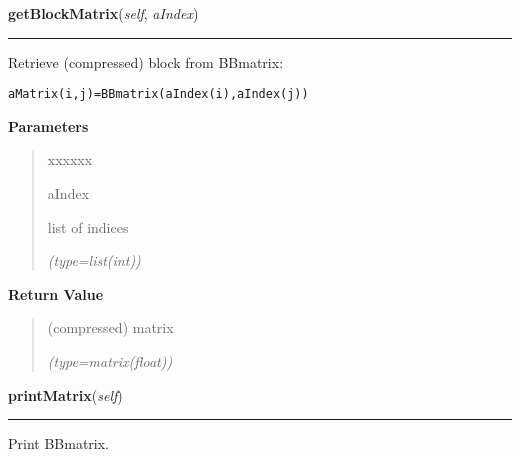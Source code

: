 \hspace{.8\funcindent}\begin{boxedminipage}{\funcwidth}

    \raggedright \textbf{getBlockMatrix}(\textit{self}, \textit{aIndex})

    \vspace{-1.5ex}

    \rule{\textwidth}{0.5\fboxrule}
\setlength{\parskip}{2ex}
    Retrieve (compressed) block from BBmatrix:

\begin{alltt}
 aMatrix(i,j) = BBmatrix(aIndex(i),aIndex(j))\end{alltt}

\setlength{\parskip}{1ex}
      \textbf{Parameters}
      \vspace{-1ex}

      \begin{quote}
        \begin{Ventry}{xxxxxx}

          \item[aIndex]

          list of indices

            {\it (type=list(int))}

        \end{Ventry}

      \end{quote}

      \textbf{Return Value}
    \vspace{-1ex}

      \begin{quote}
      (compressed) matrix

      {\it (type=matrix(float))}

      \end{quote}

    \end{boxedminipage}

    \label{gblnum:BorderedBandMatrix:printMatrix}

    \vspace{0.5ex}

\hspace{.8\funcindent}\begin{boxedminipage}{\funcwidth}

    \raggedright \textbf{printMatrix}(\textit{self})

    \vspace{-1.5ex}

    \rule{\textwidth}{0.5\fboxrule}
\setlength{\parskip}{2ex}
    Print BBmatrix.

\setlength{\parskip}{1ex}
    \end{boxedminipage}

